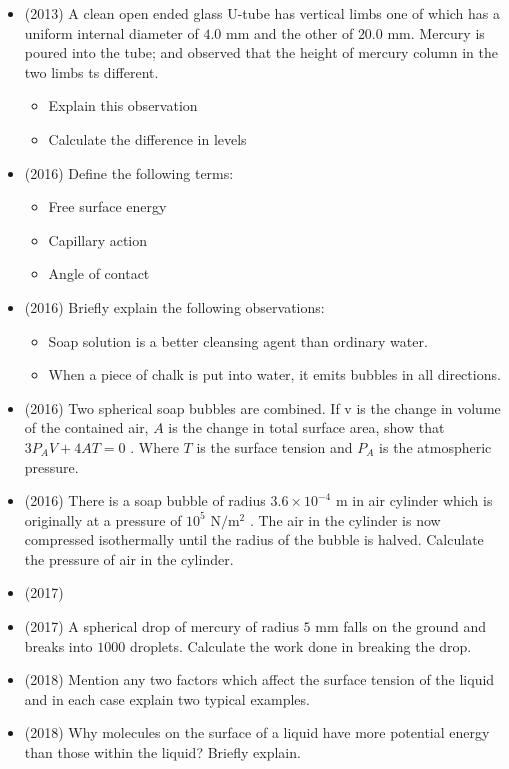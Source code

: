 \documentclass{article}
\begin{document}
\begin{itemize}
\item (2013)  A clean open ended glass U-tube has vertical limbs one of which has a uniform internal diameter of $ 4.0$ mm and the other of $ 20.0$ mm. Mercury is poured into the tube; and observed that the height of mercury column in the two limbs ts different.\begin{itemize}
\item Explain this observation
\item Calculate the difference in levels
\end{itemize}
\item (2016)  Define the following terms:\begin{itemize}
\item Free surface energy
\item Capillary action
\item Angle of contact
\end{itemize}
\item (2016)  Briefly explain the following observations:\begin{itemize}
\item Soap solution is a better cleansing agent than ordinary water.
\item When a piece of chalk is put into water, it emits bubbles in all directions.
\end{itemize}
\item (2016)  Two spherical soap bubbles are combined.  If v is the change in volume of the contained air, $ A$ is the change in total surface area, show that $ 3P_{A}V+4A T=0$ . Where $ T$ is the surface tension and $ P_{A}$ is the atmospheric pressure.
\item (2016)  There is a soap bubble of radius $ 3.6 \times 10^{-4}$ m in air cylinder which is originally at a pressure of $ 10^{5}$ N$/$m$ ^{2}$ . The air in the cylinder is now compressed isothermally until the radius of the bubble is halved. Calculate the pressure of air in the cylinder.
\item (2017)  \item (2017)  A spherical drop of mercury of radius $ 5$ mm falls on the ground and breaks into $ 1000$ droplets. Calculate the work done in breaking the drop. 
\item (2018)  Mention any two factors which affect the surface tension of the liquid and in each case explain two typical examples. 
\item (2018)  Why molecules on the surface of a liquid have more potential energy than those within the liquid? Briefly explain. 

\end{itemize}
\end{document}
